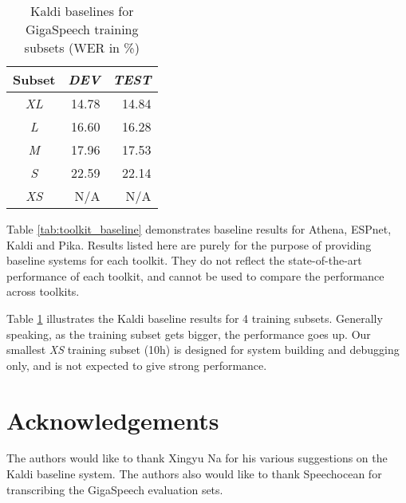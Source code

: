 \documentclass[a4paper]{article}
\begin{document}
\begin{table}[t]
  \caption{Kaldi baselines for GigaSpeech training subsets (WER in \%)}
  \vspace{-2ex}
  \label{tab:kaldi_baseline}
  \centering
  \begin{tabular}{c|rr}
    \toprule
    \textbf{Subset}                        & \textbf{\textit{DEV}}    & \textbf{\textit{TEST}} \\
    \midrule
    \textit{XL}                            & 14.78                    & 14.84 \\
    \textit{L}                             & 16.60                    & 16.28 \\
    \textit{M}                             & 17.96                    & 17.53 \\
    \textit{S}                             & 22.59                    & 22.14 \\
    \textit{XS}                            & N/A                      & N/A \\
    \bottomrule
  \end{tabular}
  \vspace{-4ex}
\end{table}

Table \ref{tab:toolkit_baseline} demonstrates baseline results for Athena, ESPnet, Kaldi and Pika. Results listed here are purely for the purpose of providing baseline systems for each toolkit. They do not reflect the state-of-the-art performance of each toolkit, and cannot be used to compare the performance across toolkits.

Table \ref{tab:kaldi_baseline} illustrates the Kaldi baseline results for 4 training subsets. Generally speaking, as the training subset gets bigger, the performance goes up. Our smallest {\it XS} training subset (10h) is designed for system building and debugging only, and is not expected to give strong performance.

\section{Acknowledgements}
The authors would like to thank Xingyu Na for his various suggestions on the
Kaldi baseline system. The authors also would like to thank Speechocean for
transcribing the GigaSpeech evaluation sets.




\end{document}
